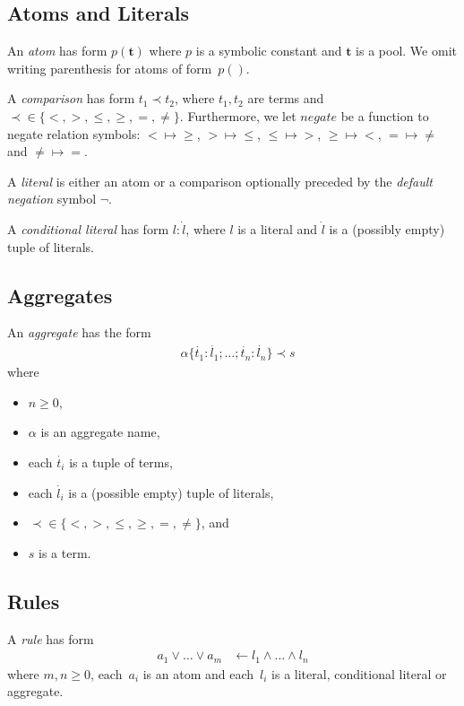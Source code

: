 \documentclass{article}
\newcommand{\pool}[1]{\boldsymbol{#1}}
\newcommand{\tuple}[1]{\dot{#1}}
\newcommand{\set}[1]{\{#1\}}
\newcommand\Negate{\mathit{negate}}
\begin{document}
	\subsection{Atoms and Literals}

	An \emph{atom} has form $p(\pool{t})$ where $p$ is a symbolic constant and $\pool{t}$ is a pool.
	We omit writing parenthesis for atoms of form~\(p()\).

	A \emph{comparison} has form $t_1 \prec t_2$, where $t_1,t_2$ are terms and ${\prec} \in \set{{<}, {>}, {\leq}, {\geq}, {=}, {\neq}}$.
	Furthermore, we let $\Negate$ be a function to negate relation symbols:
	${<} \mapsto {\geq}$,
	${>} \mapsto {\leq}$,
	${\leq} \mapsto {>}$,
	${\geq} \mapsto {<}$,
	${=} \mapsto {\neq}$ and
	${\neq} \mapsto {=}$.

	A \emph{literal} is either an atom or a comparison optionally preceded by the \emph{default negation} symbol $\neg$.

	A \emph{conditional literal} has form $l : \tuple{l}$, where $l$ is a literal and $\tuple{l}$ is a (possibly empty) tuple of literals.

	\subsection{Aggregates}
	An \emph{aggregate} has the form
	\begin{align}
		&\alpha\{\tuple{t_1} : \tuple{l_1}; \dots; \tuple{t_n} : \tuple{l_n}\} \prec s \label{aggregate}
	\end{align}
	where
	\begin{itemize}
		\item $n \geq 0$,
		\item $\alpha$ is an aggregate name,
		\item each $\tuple{t_i}$ is a tuple of terms,
		\item each $\tuple{l_i}$ is a (possible empty) tuple of literals,
		\item ${\prec} \in \set{{<}, {>}, {\leq}, {\geq}, {=}, {\neq}}$, and
		\item $s$ is a term.
	\end{itemize}

	\subsection{Rules}

	A \emph{rule} has form
	\begin{align}
		a_1 \vee \dots \vee a_m &\leftarrow l_1 \wedge \dots \wedge l_n \label{rule}
	\end{align}
	where $m, n \ge 0$, each~$a_i$ is an atom and each~$l_i$ is a literal, conditional literal or aggregate.
\end{document}
